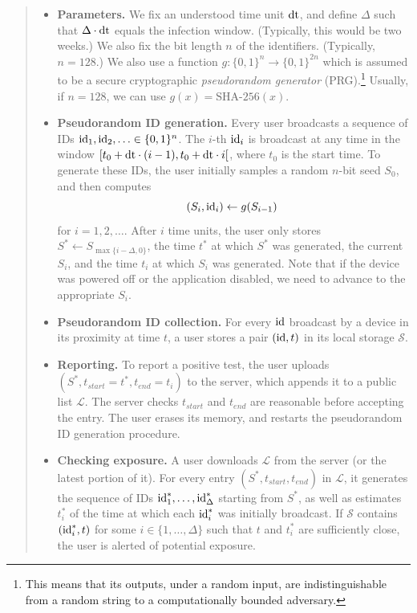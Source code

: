 \documentclass{article}
\newcommand{\TODO}[1]{ {\color{blue} #1 }}
\begin{document}
\begin{quote}
\begin{itemize}
    \item {\bf Parameters.} We fix an understood time unit $\mathrm{dt}$, and define $\Delta$ such that $\Delta \cdot \mathrm{dt}$ equals the infection window. (Typically, this would be two weeks.) We also fix the bit length $n$ of the identifiers. (Typically, $n = 128$.) We also use a function $g: \{0,1\}^n \to \{0,1\}^{2n}$ which is assumed to be a secure cryptographic {\em pseudorandom generator} (PRG).\footnote{This means that its outputs, under a random input, are indistinguishable from a random string to a computationally bounded adversary.} Usually, if $n = 128$, we can use $g(x) = \textrm{SHA-256}(x)$.
    \item {\bf Pseudorandom ID generation.} Every user broadcasts a sequence of IDs $\mathrm{id}_1, \mathrm{id}_2, \ldots \in \{0,1\}^n$.  The $i$-th $\mathrm{id}_i$ is broadcast at any time in the window $[t_0 + \mathrm{dt}\cdot (i-1), t_0 + \mathrm{dt}\cdot i[$, where $t_0$ is the start time. To generate these IDs, the user initially samples a random $n$-bit seed $S_0$, and then computes
\begin{displaymath}
(S_i, \mathrm{id}_i) \gets g(S_{i-1}) \;
\end{displaymath}
for $i = 1,2, \ldots$.
After $i$ time units, the user only stores $S^* \gets S_{\max\{i-\Delta,0\}}$, the time $t^*$ at which $S^*$ was generated, the current $S_i$, and the time $t_i$ at which $S_i$ was generated. Note that if the device was powered off or the application disabled, we need to advance to the appropriate $S_i$. 

\item {\bf Pseudorandom ID collection.} For every $\mathrm{id}$ broadcast by a device in its proximity at time $t$, a user stores a pair $(\mathrm{id}, t)$ in its local storage $\mathcal{S}$.
\item {\bf Reporting.} To report a positive test, the user uploads $(S^*, t_{start}=t^*, t_{end}=t_i)$ to the server, which appends it to a public list $\mathcal{L}$. The server checks $t_{start}$ and $t_{end}$ are reasonable before accepting the entry. The user erases its memory, and restarts the pseudorandom ID generation procedure.
\item {\bf Checking exposure.} A user downloads $\mathcal{L}$ from the server (or the latest portion of it). For every entry $(S^*,t_{start}, t_{end})$ in $\mathcal{L}$, it generates the sequence of IDs $\mathrm{id}^*_1, \ldots, \mathrm{id}^*_{\Delta}$ starting from $S^*$, as well as  estimates $t_i^*$ of the time at which each $\mathrm{id}_i^*$ was initially broadcast. If $\mathcal{S}$ contains $(\mathrm{id}_i^*, t)$ for some $i \in \{1, \ldots, \Delta\}$ such that $t$ and $t_i^*$ are sufficiently close, the user is alerted of potential exposure.
\end{itemize}
\end{quote}
\end{document}
